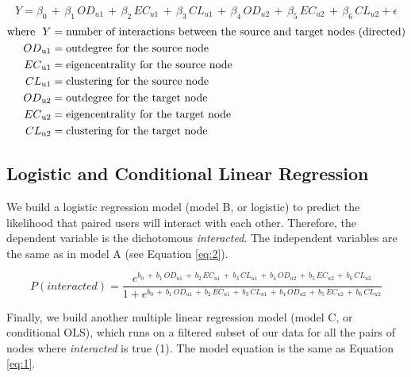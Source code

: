 \begin{equation}
  Y=\beta_0\,+\,\beta_1\,OD_{u1}\,+\,\beta_2\,EC_{u1}\,+\,\beta_3\,CL_{u1}\,+\,\beta_4\,OD_{u2}\,+\,\beta_5\,EC_{u2}\,+\,\beta_6\,CL_{u2}+\epsilon \label{eq:1}
\end{equation}
{\footnotesize
\begingroup
\addtolength{\jot}{-5pt}
\begin{align*}
  \text{where  }~Y &= \text{number of interactions between the source and target nodes (directed)} \\
  OD\textsubscript{u1} &= \text{outdegree for the source node} \\
  EC\textsubscript{u1} &= \text{eigencentrality for the source node} \\
  CL\textsubscript{u1} &= \text{clustering for the source node} \\
  OD\textsubscript{u2} &= \text{outdegree for the target node} \\
  EC\textsubscript{u2} &= \text{eigencentrality for the target node} \\
  CL\textsubscript{u2} &= \text{clustering for the target node}
\end{align*}
\endgroup
}%
\subsection{Logistic and Conditional Linear Regression}
We build a logistic regression model (model B, or logistic) to predict the likelihood that paired users will interact with each other. Therefore, the dependent variable is the dichotomous \textit{interacted}. The independent variables are the same as in model A (see Equation \vref{eq:2}).

\begin{equation}
  P(interacted)=\frac{e^{b_0\,+\,b_1\,OD_{u1}\,+\,b_2\,EC_{u1}\,+\,b_3\,CL_{u1}\,+\,b_4\,OD_{u2}\,+\,b_5\,EC_{u2}\,+\,b_6\,CL_{u2}}}{1+e^{b_0\,+\,b_1\,OD_{u1}\,+\,b_2\,EC_{u1}\,+\,b_3\,CL_{u1}\,+\,b_4\,OD_{u2}\,+\,b_5\,EC_{u2}\,+\,b_6\,CL_{u2}}} \label{eq:2}
\end{equation}

\vspace{15pt}
Finally, we build another multiple linear regression model (model C, or conditional OLS), which runs on a filtered subset of our data for all the pairs of nodes where \textit{interacted} is true (1). The model equation is the same as Equation \vref{eq:1}.
